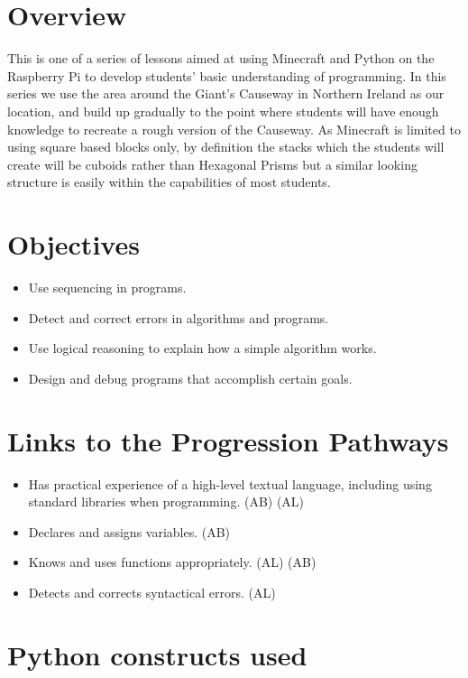 \documentclass{geocraft-lesson-plan}
\begin{document}
\subtitle{Part 1 - Sequencing}

\section*{Overview} This is one of a series of lessons aimed at using Minecraft and Python on the Raspberry Pi to
develop students' basic understanding of programming. In this series we use the area around the Giant's Causeway in 
Northern Ireland as our location, and build up gradually to the point where students will have enough knowledge to
recreate a rough version of the Causeway. As Minecraft is limited to using square based blocks only, by definition the
stacks which the students will create will be cuboids rather than Hexagonal Prisms but a similar looking structure is
easily within the capabilities of most students.

\section*{Objectives}

\begin{itemize}
\item Use sequencing in programs.
\item Detect and correct errors in algorithms and programs.
\item Use logical reasoning to explain how a simple algorithm works.
\item Design and debug programs that accomplish certain goals.
\end{itemize}

\section*{Links to the Progression Pathways}

\begin{itemize}
\item Has practical experience of a high-level textual language, including using standard libraries when
  programming. (AB) (AL) 
\item Declares and assigns variables. (AB)
\item Knows and uses functions appropriately. (AL) (AB)
\item Detects and corrects syntactical errors. (AL)
\end{itemize}

\section*{Python constructs used}
\end{document}
